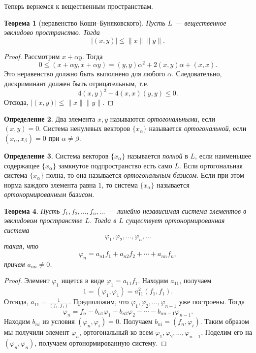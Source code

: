\documentclass[12pt, titlepage, oneside]{amsbook}
\newtheorem{theorem}{Теорема}[chapter]
\theoremstyle{definition}
\newtheorem{definition}[theorem]{Определение}
\theoremstyle{remark}
\begin{document}
Теперь вернемся к вещественным пространствам.

\begin{theorem}[неравенство Коши--Буняковского]
\label{Ev1}
Пусть $L$ --- вещественное эвклидово пространство. Тогда $$|(x,y)|\leq\|x\| \|y\|.$$
\end{theorem}


\begin{proof}
Рассмотрим $x+\alpha y$. Тогда $$0\leq (x+\alpha y,x+\alpha y)=(y,y)\alpha^2+2(x,y)\alpha+(x,x).$$ Это неравенство должно быть выполнено для любого $\alpha$. Следовательно, дискриминант должен быть отрицательным, т.е. $$4(x,y)^2-4(x,x)(y,y)\leq 0.$$ Отсюда, $|(x,y)|\leq\|x\| \|y\|.$
\end{proof}

\begin{definition}
Два элемента $x,y$ называются \emph{ортогональными}, если $(x,y)=0$. Система ненулевых векторов $\{x_{\alpha}\}$ называется \emph{ортогональной}, если $(x_{\alpha},x_{\beta})=0$ при $\alpha\neq\beta$.
\end{definition}

\begin{definition}
Система векторов $\{x_{\alpha}\}$ называется \emph{полной} в $L$, если наименьшее содержащее $\{x_{\alpha}\}$ замкнутое подпространство есть само $L$. Если ортогональная система $\{x_{\alpha}\}$ полна, то она называется \emph{ортогональным базисом}. Если при этом норма каждого элемента равна $1$, то система $\{x_{\alpha}\}$ называется \emph{ортонормированным базисом}.
\end{definition}

\begin{theorem}
\label{Ev2}
Пусть $f_1,f_2,\ldots, f_n,\ldots$ --- линейно независимая система элементов в эвклидовом пространстве $L$. Тогда в $L$ существует ортонормированная система $$\varphi_1, \varphi_2,\ldots, \varphi_n,\ldots$$ такая, что $$\varphi_n=a_{n1}f_1+a_{n2}f_2+\cdots+a_{nn}f_n,$$ причем $a_{nn}\neq 0$.
\end{theorem}

\begin{proof}
Элемент $\varphi_1$ ищется в виде $\varphi_1=a_{11} f_1$. Находим $a_{11}$, получаем $$1=(\varphi_1,\varphi_1)=a_{11}^2(f_1,f_1).$$ Отсюда, $a_{11}=\frac{1}{(f_1,f_1)}$. Предположим, что $\varphi_1, \varphi_2,\ldots, \varphi_{n-1}$ уже построены. Тогда $$\varphi_n=f_n-b_{n1}\varphi_1-b_{n2}\varphi_2-\cdots-b_{n n-1}\varphi_{n-1}.$$ Находим $b_{ni}$ из условия $(\varphi_n,\varphi_i)=0$. Получаем $b_{ni}=(f_n,\varphi_i)$. Таким образом мы получили элемент $\varphi_n$, ортогональный ко всем $\varphi_1, \varphi_2,\ldots, \varphi_{n-1}$. Поделим его на $(\varphi_n,\varphi_n)$, получаем ортонормированную систему.
\end{proof}
\end{document}
